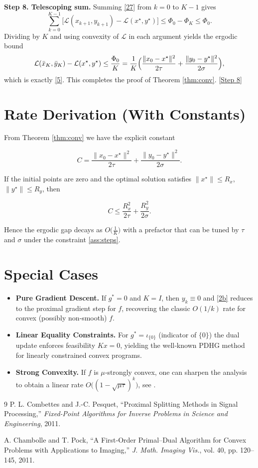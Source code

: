 \documentclass{article}
\begin{document}
\medskip
\noindent\textbf{Step 8. Telescoping sum.}  
Summing \eqref{27} from $k=0$ to $K-1$ gives
\[
\sum_{k=0}^{K-1}\bigl[\mathcal L(x_{k+1},y_{k+1})-\mathcal L(x^{\star},y^{\star})\bigr]
\le \Phi_{0}-\Phi_{K}
\le \Phi_{0}.
\tag{28}
\]
Dividing by $K$ and using convexity of $\mathcal L$ in each argument yields the ergodic bound
\[
\mathcal L(\bar x_{K},\bar y_{K})-\mathcal L(x^{\star},y^{\star})
\le \frac{\Phi_{0}}{K}
= \frac{1}{K}\Bigl(\frac{\|x_{0}-x^{\star}\|^{2}}{2\tau}
+\frac{\|y_{0}-y^{\star}\|^{2}}{2\sigma}\Bigr),
\]
which is exactly \eqref{5}. This completes the proof of Theorem \ref{thm:conv}.
\noindent\underline{[Step 8]}

\section*{Rate Derivation (With Constants)}
From Theorem \ref{thm:conv} we have the explicit constant  

\[
C = \frac{\|x_{0}-x^{\star}\|^{2}}{2\tau}
    +\frac{\|y_{0}-y^{\star}\|^{2}}{2\sigma}.
\]

If the initial points are zero and the optimal solution satisfies $\|x^{\star}\|\le R_{x}$, $\|y^{\star}\|\le R_{y}$, then  

\[
C \le \frac{R_{x}^{2}}{2\tau} + \frac{R_{y}^{2}}{2\sigma}.
\]

Hence the ergodic gap decays as $O\!\bigl(\frac{1}{K}\bigr)$ with a prefactor that can be tuned by $\tau$ and $\sigma$ under the constraint \eqref{ass:steps}.

\section*{Special Cases}
\begin{itemize}
\item \textbf{Pure Gradient Descent.} If $g^{*}=0$ and $K=I$, then $y_{k}\equiv0$ and \eqref{2b} reduces to the proximal gradient step for $f$, recovering the classic $O(1/k)$ rate for convex (possibly non‑smooth) $f$.
\item \textbf{Linear Equality Constraints.} For $g^{*}=\iota_{\{0\}}$ (indicator of $\{0\}$) the dual update enforces feasibility $Kx=0$, yielding the well‑known PDHG method for linearly constrained convex programs.
\item \textbf{Strong Convexity.} If $f$ is $\mu$‑strongly convex, one can sharpen the analysis to obtain a linear rate $O\bigl((1-\sqrt{\mu\tau})^{k}\bigr)$, see \cite{Chambolle2011}.
\end{itemize}

\begin{thebibliography}{9}
P. L. Combettes and J.-C. Pesquet, ``Proximal Splitting Methods in Signal Processing,'' \emph{Fixed-Point Algorithms for Inverse Problems in Science and Engineering}, 2011.

A. Chambolle and T. Pock, ``A First‑Order Primal–Dual Algorithm for Convex Problems with Applications to Imaging,'' \emph{J. Math. Imaging Vis.}, vol. 40, pp. 120–145, 2011.
\end{thebibliography}
\end{document}

